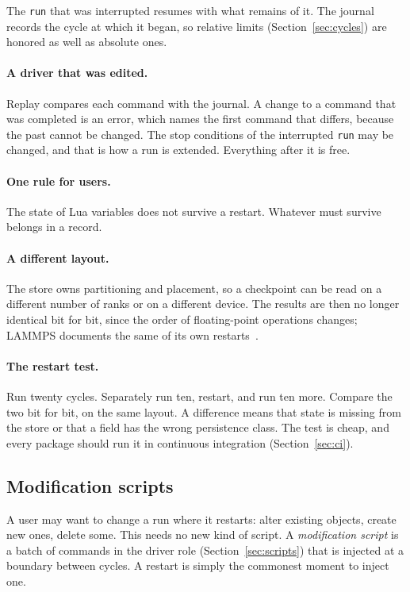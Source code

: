 \documentclass[11pt,a4paper]{article}
\newcommand{\code}[1]{\texttt{#1}}
\begin{document}
The \code{run} that was interrupted resumes with what remains of it.  The
journal records the cycle at which it began, so relative limits
(Section~\ref{sec:cycles}) are honored as well as absolute ones.

\paragraph{A driver that was edited.}  Replay compares each command with
the journal.  A change to a command that was completed is an error, which
names the first command that differs, because the past cannot be changed.
The stop conditions of the interrupted \code{run} may be changed, and that
is how a run is extended.  Everything after it is free.

\paragraph{One rule for users.}  The state of Lua variables does not
survive a restart.  Whatever must survive belongs in a record.

\paragraph{A different layout.}  The store owns partitioning and placement,
so a checkpoint can be read on a different number of ranks or on a
different device.  The results are then no longer identical bit for bit,
since the order of floating-point operations changes; LAMMPS documents the
same of its own restarts~\cite{lammpsrestart}.

\paragraph{The restart test.}  Run twenty cycles.  Separately run ten,
restart, and run ten more.  Compare the two bit for bit, on the same layout.
A difference means that state is missing from the store or that a field has
the wrong persistence class.  The test is cheap, and every package should
run it in continuous integration (Section~\ref{sec:ci}).

\subsection{Modification scripts}
\label{sec:modification}

A user may want to change a run where it restarts: alter existing objects,
create new ones, delete some.  This needs no new kind of script.  A
\emph{modification script} is a batch of commands in the driver role
(Section~\ref{sec:scripts}) that is injected at a boundary between cycles.
A restart is simply the commonest moment to inject one.
\end{document}
